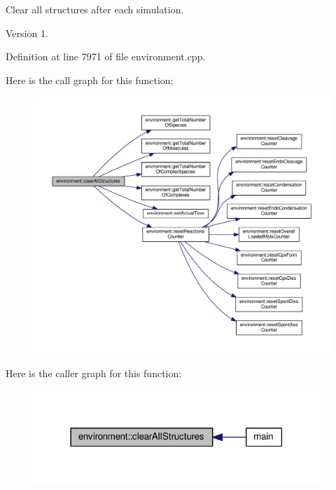 Clear all structures after each simulation. 

\begin{DoxyVersion}{Version}
1. 
\end{DoxyVersion}


Definition at line 7971 of file environment.\-cpp.



Here is the call graph for this function\-:\nopagebreak
\begin{figure}[H]
\begin{center}
\leavevmode
\includegraphics[width=350pt]{a00011_aa860227725dbe5b0251a25f440773161_cgraph}
\end{center}
\end{figure}




Here is the caller graph for this function\-:\nopagebreak
\begin{figure}[H]
\begin{center}
\leavevmode
\includegraphics[width=306pt]{a00011_aa860227725dbe5b0251a25f440773161_icgraph}
\end{center}
\end{figure}


